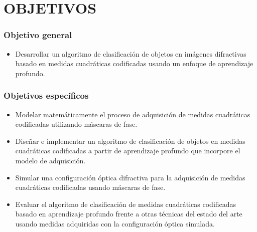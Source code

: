 
\chapter{OBJETIVOS}

\subsection*{Objetivo general}

\begin{itemize}
   \item Desarrollar un algoritmo de clasificación de objetos en imágenes difractivas basado en medidas cuadráticas codificadas usando un enfoque de aprendizaje profundo.
\end{itemize}

\subsection*{Objetivos específicos}


\begin{itemize}

    \item Modelar matemáticamente el proceso de adquisición de medidas cuadráticas codificadas utilizando máscaras de fase.

    \item Diseñar e implementar un algoritmo de clasificación de objetos en medidas cuadráticas codificadas a partir de aprendizaje profundo que incorpore el modelo de adquisición.
    
    \item Simular una configuración óptica difractiva para la adquisición de medidas cuadráticas codificadas usando máscaras de fase.
    
    \item Evaluar el algoritmo de clasificación de medidas cuadráticas codificadas basado en aprendizaje profundo frente a otras técnicas del estado del arte usando medidas adquiridas con la configuración óptica simulada.

\end{itemize}
\pagebreak


